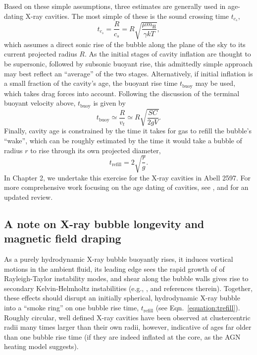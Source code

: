 Based on these simple assumptions, three estimates are generally used in age-dating X-ray cavities. 
The most simple of these is the sound crossing time $t_{c_s}$, 
\begin{equation}
t_{c_s} = \frac{R}{c_s} = R \sqrt{\frac{\mu m_\mathrm{H}}{\gamma kT}}, 
\end{equation}
which assumes a direct sonic rise of the bubble along the plane of the sky to its current projected radius $R$. 
As the initial stages of cavity inflation are thought to be supersonic, followed by subsonic buoyant rise, 
this admittedly simple approach may best reflect an ``average'' of the two stages. 
Alternatively, if initial inflation is a small fraction of the cavity's age, the buoyant rise time $t_\mathrm{buoy}$ may be used, 
which takes drag forces into account. 
Following the discussion of the terminal buoyant velocity above, $t_\mathrm{buoy}$ is given by 
\begin{equation}
t_\mathrm{buoy} \simeq \frac{R}{v_t} \simeq R \sqrt{\frac{SC}{2gV}}. 
\end{equation}
Finally, cavity age is constrained by the time it takes for gas to refill 
the bubble's ``wake'', which can be roughly estimated by the time 
it would take a bubble of radius $r$ to rise through its own projected diameter, 
\begin{equation}
t_\mathrm{refill} = 2 \sqrt{\frac{r}{g}}.
\label{equation:trefill} 
\end{equation}
In Chapter 2, we undertake this exercise for the X-ray cavities in Abell 2597. For more comprehensive 
work focusing on the age dating of cavities, see \citet{birzan04,rafferty06}, and \citet{mcnamara07} for 
an updated review.  



\subsection{A note on X-ray bubble longevity and magnetic field draping}

\label{section:bubbledisrupt}


As a purely hydrodynamic X-ray bubble buoyantly rises, it induces vortical motions in the ambient fluid, 
its leading edge sees the rapid growth of 
of Rayleigh-Taylor instability modes, and shear along the bubble walls gives rise to secondary Kelvin-Helmholtz 
instabilities (e.g., \citealt{soker02,robinson04,dursi08}, and references therein).
Together, these effects should disrupt an initially spherical, hydrodynamic X-ray bubble 
into a ``smoke ring'' on one bubble rise time,  $t_\mathrm{refill}$ (see Eqn.~\ref{equation:trefill}). 
Roughly circular, well defined X-ray cavities have been observed at clustercentric radii many times larger than their own radii, however, 
indicative of ages far older than one bubble rise time (if they are indeed inflated at the core, as
the AGN heating model suggests). 


